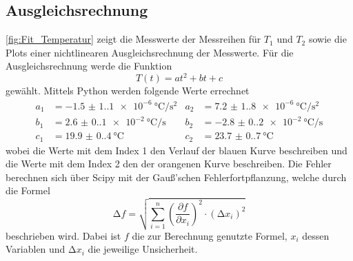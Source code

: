     \subsection{Ausgleichsrechnung}
    \autoref{fig:Fit_Temperatur} zeigt die Messwerte der Messreihen für $T_1$
    und $T_2$ sowie die Plots einer nichtlinearen Ausgleichsrechnung der Messwerte.
    Für die Ausgleichsrechnung werde die Funktion
    \begin{equation}
        T(t) = at^2+bt+c
        \label{eq:Ausgleich}
    \end{equation}
    gewählt.
    Mittels Python werden folgende Werte errechnet
    \begin{align*}
        a_1 &= \SI{-1.5(1.1)e-6}{\degreeCelsius\per\square\second}
        & a_2 &= \SI{7.2(1.8)e-6}{\degreeCelsius\per\square\second}\\
        b_1 &= \SI{2.6(0.1)e-2}{\degreeCelsius\per\second}
        & b_2 &=\SI{-2.8(0.2)e-2}{\degreeCelsius\per\second}\\
        c_1 &=\SI{19.9(0.4)}{\degreeCelsius}
        & c_2 &=\SI{23.7(0.7)}{\degreeCelsius}
    \end{align*}
    wobei die Werte mit dem Index 1 den Verlauf der blauen Kurve beschreiben
    und die Werte mit dem Index 2 den der orangenen Kurve beschreiben.
    Die Fehler berechnen sich über Scipy mit der Gauß'schen Fehlerfortpflanzung, 
    welche durch die Formel 
    \begin{equation}
    \increment f= \sqrt{\sum_{i=1}^n\left(\frac{\partial f}{\partial x_i}
    \right)^2\cdot (\increment x_i)^2}
    \end{equation}
    beschrieben wird. Dabei ist $f$ die zur Berechnung genutzte Formel, $x_i$ dessen
    Variablen und $\increment x_i$ die jeweilige Unsicherheit.
